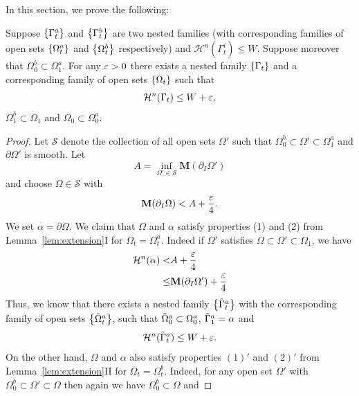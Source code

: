 In this section, we prove the following:
\begin{proposition}\label{prop:gluing-two-nested}
    Suppose $\left\{\Gamma_t^a\right\}$ and $\left\{\Gamma_t^b\right\}$ are two nested families (with corresponding families of open sets $\left\{\Omega_t^a\right\}$ and $\left\{\Omega_t^b\right\}$ respectively) and $\mathcal{H}^n(\Gamma_t^i) \leq W$. Suppose moreover that $\Omega_0^b \subset \Omega_1^a$. For any $\varepsilon > 0$ there exists a nested family $\left\{\Gamma_t\right\}$ and a corresponding family of open sets $\left\{\Omega_t\right\}$ such that
    \begin{equation*}
        \mathcal{H}^n(\Gamma_t) \leq W + \varepsilon,
    \end{equation*}
    $\Omega_1^b \subset \Omega_1$ and $\Omega_0 \subset \Omega_0^a$.
    \begin{proof}
        Let $\mathcal{S}$ denote the collection of all open sets $\Omega'$ such that $\Omega_0^b \subset \Omega' \subset \Omega_1^a$ and $\partial\Omega'$ is smooth. Let
        \begin{equation*}
            A = \inf_{\Omega'\in\mathcal{S}}\mathbf{M}(\partial_I\Omega')
        \end{equation*}
        and choose $\Omega\in \mathcal{S}$ with
        \begin{equation*}
            \mathbf{M}(\partial_I\Omega) < A + \frac{\varepsilon}{4}.
        \end{equation*}
        We set $\alpha = \partial\Omega$. We claim that $\Omega$ and $\alpha$ satisfy properties (1) and (2) from Lemma~\ref{lem:extension}I for $\Omega_t = \Omega_t^a$. Indeed if $\Omega'$ satisfies $\Omega \subset \Omega' \subset \Omega_1$, we have
        \begin{equation*}
        \begin{split}
            \mathcal{H}^n(\alpha) <& A + \frac{\varepsilon}{4}\\
            \leq& \mathbf{M}(\partial_I\Omega') + \frac{\varepsilon}{4}
        \end{split}
        \end{equation*}
        Thus, we know that there exists a nested family $\left\{\Tilde{\Gamma}_t^a\right\}$ with the corresponding family of open sets $\left\{\Tilde{\Omega}_t^a\right\}$, such that $\Tilde{\Omega}_0^a \subset \Omega_0^a$, $\Tilde{\Gamma}_1^a = \alpha$ and
        \begin{equation*}
            \mathcal{H}^n(\Tilde{\Gamma}_t^a) \leq W + \varepsilon.
        \end{equation*}
        On the other hand, $\Omega$ and $\alpha$ also satisfy properties $(1)'$ and $(2)'$ from Lemma~\ref{lem:extension}II for $\Omega_t = \Omega_t^b$. Indeed, for any open set $\Omega'$ with $\Omega_0^b \subset \Omega' \subset \Omega$ then again we have $\Omega_0^b \subset \Omega$ and

\end{proof}
\end{proposition}
